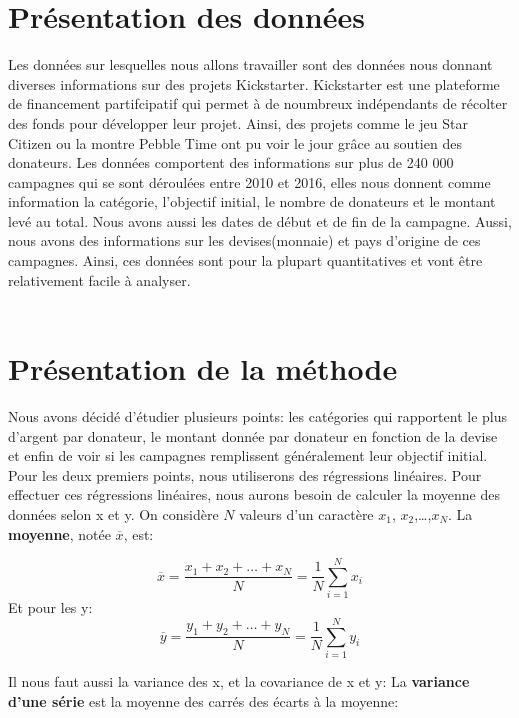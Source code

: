 \documentclass{article}
\begin{document}
\section{Présentation des données}
\label{donnees}
\tabto{1cm} Les données sur lesquelles nous allons travailler sont des données nous donnant diverses informations sur des projets Kickstarter. Kickstarter est une plateforme de financement partifcipatif qui permet à de noumbreux indépendants de récolter des fonds pour développer 
leur projet. Ainsi, des projets comme le jeu Star Citizen ou la montre Pebble Time ont pu voir le jour grâce au soutien des donateurs. Les données comportent des informations sur plus de 240 000 campagnes qui se sont déroulées entre 2010 et 2016, elles nous donnent comme information la catégorie, l'objectif initial, le nombre de donateurs et le montant levé au total. Nous avons aussi les dates de début et de fin de la campagne.
Aussi, nous avons des informations sur les devises(monnaie) et pays d'origine de ces campagnes. Ainsi, ces données sont pour la plupart quantitatives et vont être relativement facile à analyser.
\\
\\

\section{Présentation de la méthode}
\label{methode}
\tabto{1cm} Nous avons décidé d'étudier plusieurs points: les catégories qui rapportent le plus d'argent par donateur, le montant donnée par donateur en fonction de la devise et enfin de voir si les campagnes remplissent généralement leur objectif initial.
\tabto{1cm}Pour les deux premiers points, nous utiliserons des régressions linéaires. Pour effectuer ces régressions linéaires, nous aurons besoin de calculer la moyenne des données selon x et y. On considère $N$ valeurs d'un caractère $x_1$, $x_2$,\dots,$x_N$. 
La {\bf moyenne}, notée $\overline{x}$, est: 
\vspace{0.3cm}

\[
\overline{x}=\dfrac{x_1+x_2+\dots+x_N}{N}
=\dfrac{1}{N}\sum_{i=1}^N x_i
\]
Et pour les y:
\vspace{0.3cm}
\[
\overline{y}=\dfrac{y_1+y_2+\dots+y_N}{N}
=\dfrac{1}{N}\sum_{i=1}^N y_i
\]
\vspace{0.3cm}

Il nous faut aussi la variance des x, et la covariance de x et y:
\vspace{0.3cm}
La {\bf variance d'une série} est la moyenne des carrés des écarts à la moyenne: 
\vspace{0.3cm}
\end{document}
